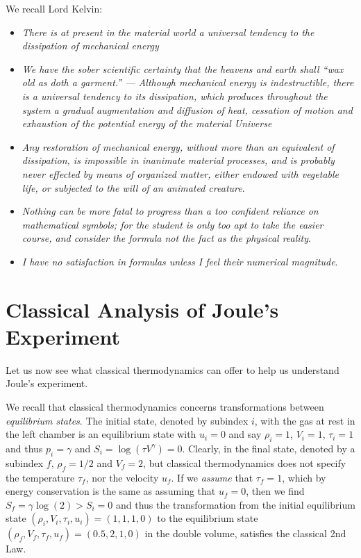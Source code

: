 We recall Lord Kelvin:
\begin{itemize}
\item \emph{There is at present in the material world a universal 
tendency to the dissipation of mechanical energy}
\item \emph{We have the sober scientific certainty that the heavens and earth shall ``wax old as doth a garment.'' ---
Although mechanical energy is indestructible, there is a universal tendency 
to its dissipation, which produces throughout the system a gradual 
augmentation and diffusion of heat, cessation of motion and exhaustion 
of the potential energy of the material Universe}
\item \emph{Any restoration of mechanical energy, without more than an equivalent 
of dissipation, is impossible in inanimate material processes, and is 
probably never effected by means of organized matter, either endowed 
with vegetable life, or subjected to the will of an animated creature}.
\item \emph{Nothing can be more fatal to progress than a too confident reliance 
on mathematical symbols; for the student is only too apt to take the 
easier course, and consider the formula not the fact as the physical 
reality}.
\item \emph{I have no satisfaction in formulas unless I feel their 
numerical magnitude}. 
\end{itemize}



\section{Classical Analysis of Joule's Experiment}

Let us now see what classical thermodynamics can offer 
to help us understand Joule's experiment.

We recall that classical thermodynamics concerns transformations 
between \emph{equilibrium states}. The initial state,
denoted by subindex $i$,  with
the gas at rest in the left chamber is an equilibrium state
with $u_i=0$ and say $\rho_i =1$, $V_i =1$, $\tau_i =1$ and thus $p_i=\gamma$
and $S_i=\log(\tau V^\gamma )=0$. 
Clearly, in the final state, denoted by a subindex $f$,
 $\rho_f =1/2$ and $V_f=2$, but
classical thermodynamics does not specify the 
temperature $\tau_f$, nor the velocity $u_f$.
If we \emph{assume} that $\tau_f =1$,
which by energy conservation is the same as assuming
that $u_f=0$, then we find $S_f=\gamma\log(2)>S_i=0$ and 
thus the transformation from the
initial equilibrium state $(\rho_i,V_i,\tau_i,u_i)=(1,1,1,0)$
to the equilibrium state $(\rho_f,V_f,\tau_f,u_f) =(0.5,2,1,0)$ 
in the double volume, satisfies the classical 2nd Law.

